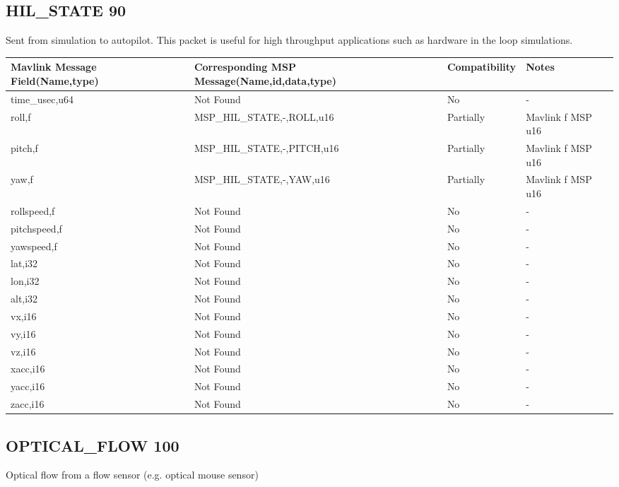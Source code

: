 \subsection{HIL\_STATE 90} 
Sent from simulation to autopilot. This packet is useful for high throughput applications such as hardware in the loop simulations.\\

{
\centering
\begin{tabular}{ |p{4cm  } |p{7cm} | p{2cm}|m{5em}|}
\hline
Mavlink Message Field(Name,type)&Corresponding MSP Message(Name,id,data,type)& Compatibility & Notes\\
\hline
time\_usec,u64 & Not Found & No & - \\
\hline
\rowcolor{lightgray}
roll,f & MSP\_HIL\_STATE,-,ROLL,u16 & Partially & Mavlink f MSP u16\\
\hline
\rowcolor{lightgray}
pitch,f & MSP\_HIL\_STATE,-,PITCH,u16& Partially & Mavlink f MSP u16 \\
\hline
\rowcolor{lightgray}
yaw,f&  MSP\_HIL\_STATE,-,YAW,u16& Partially & Mavlink f MSP u16 \\
\hline
rollspeed,f & Not Found& No & - \\
\hline
pitchspeed,f & Not Found& No & - \\
\hline
yawspeed,f & Not Found& No & - \\
\hline
lat,i32 & Not Found& No & - \\
\hline
lon,i32 & Not Found& No & - \\
\hline
alt,i32 & Not Found& No & - \\
\hline
vx,i16 & Not Found& No & - \\
\hline
vy,i16 & Not Found& No & - \\
\hline
vz,i16 & Not Found& No & - \\
\hline
xacc,i16 & Not Found& No & - \\
\hline
yacc,i16 & Not Found& No & - \\
\hline
zacc,i16 & Not Found& No & - \\
\end{tabular}
}

\cleardoublepage



\subsection{OPTICAL\_FLOW 100} 
Optical flow from a flow sensor (e.g. optical mouse sensor)\\

